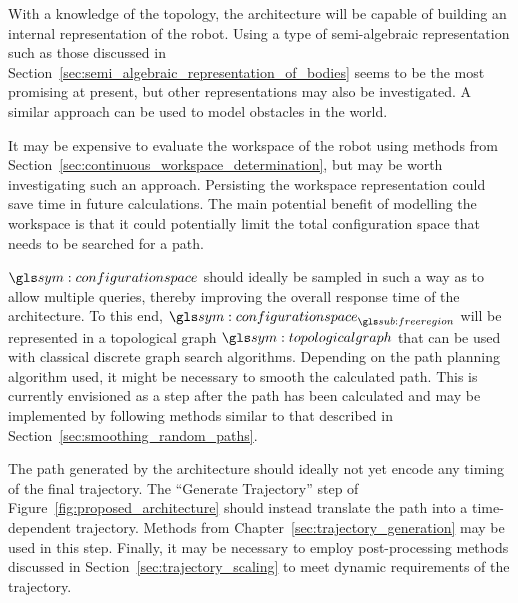 	With a knowledge of the topology, the architecture will be capable of
	building an internal representation of the robot. Using a type of
	semi-algebraic representation such as those discussed in
	Section~\ref{sec:semi_algebraic_representation_of_bodies} seems to be the
	most promising at present, but other representations may also be
	investigated. A similar approach can be used to model obstacles in the
	world.

	It may be expensive to evaluate the workspace of the robot using methods
	from Section~\ref{sec:continuous_workspace_determination}, but may be worth
	investigating such an approach. Persisting the workspace representation
	could save time in future calculations. The main potential benefit of
	modelling the workspace is that it could potentially limit the total
	configuration space that needs to be searched for a path.

	$\configurationspace$ should ideally be sampled in such a way as to allow
	multiple queries, thereby improving the overall response time of the
	architecture. To this end, $\configurationspace_{\freeregion}$ will be
	represented in a topological graph $\topologicalgraph$ that can be used with
	classical discrete graph search algorithms. Depending on the path planning
	algorithm used, it might be necessary to smooth the calculated path. This is
	currently envisioned as a step after the path has been calculated and may be
	implemented by following methods similar to that described in
	Section~\ref{sec:smoothing_random_paths}.

	The path generated by the architecture should ideally not yet encode any
	timing of the final trajectory. The ``Generate Trajectory'' step of
	Figure~\ref{fig:proposed_architecture} should instead translate the path
	into a time-dependent trajectory. Methods from
	Chapter~\ref{sec:trajectory_generation} may be used in this step. Finally,
	it may be necessary to employ post-processing methods discussed in
	Section~\ref{sec:trajectory_scaling} to meet dynamic requirements of the
	trajectory.
